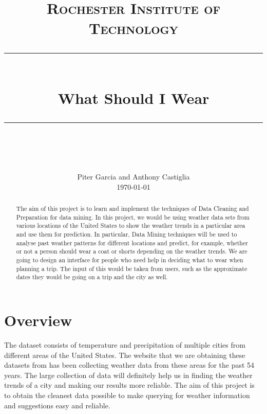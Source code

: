 \documentclass{sig-alternate}
\begin{document}
\newcommand{\horrule}[1]{\rule{\linewidth}{#1}} 	%

\title{
		\normalfont \normalsize \textsc{Rochester Institute of Technology} \\ [25pt]
		\horrule{0.5pt} \\[0.4cm]
		\huge What Should I Wear \\
		\horrule{2pt} \\[0.5cm]
		\vspace{-10mm}
}

\author{
		\normalfont 								\normalsize 
        Piter Garcia and Anthony Castiglia\\[-3pt]		\normalsize
        \today
}
\date{}
\maketitle
\begin{abstract}

The aim of this project is to learn and implement the techniques of Data Cleaning and Preparation for data mining. In this project, we would be using weather data sets from various locations of the United States to show the weather trends in a particular area and use them for prediction. In particular, Data Mining techniques will be used to analyse past weather patterns for different locations and predict, for example, whether or not a person should wear a coat or shorts depending on the weather trends. We are going to design an interface for people who need help in deciding what to wear when planning a trip. The input of this would be taken from users, such as the approximate dates they would be going on a trip and the city as well.

\end{abstract}
\vspace{5 mm}

\section{Overview}
\label{overview}

The dataset consists of temperature and precipitation of multiple cities from different areas of the United States. The website that we are obtaining these datasets from has been
collecting weather data from these areas for the past 54 years. The large collection of data will definitely help us in finding the weather trends of a city and making our results more reliable. The aim of this project is to obtain the cleanest data possible to make querying for weather information and suggestions easy and reliable.
\newline
\end{document}
